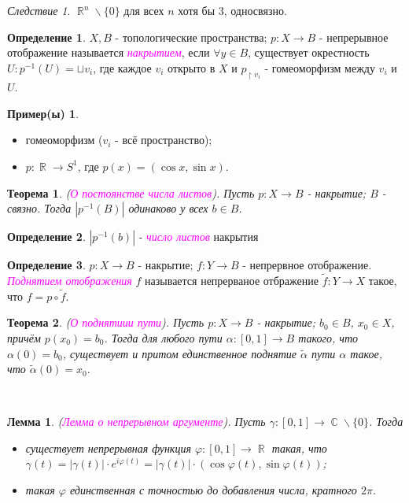 \documentclass[a4paper,100pt]{article}
\theoremstyle{indented}
\newtheorem{theorem}{Теорема}
\newtheorem{lemma}{Лемма}
\theoremstyle{definition}
\newtheorem{defn}{Определение}
\newtheorem{exl}{Пример(ы)}
\theoremstyle{remark}
\newtheorem{cons}{Следствие}
\DeclareMathOperator{\ra}{\rightarrow}
\DeclareMathOperator{\CC}{\mathbb{C}}
\DeclareMathOperator{\RR}{\mathbb{R}}
\begin{document}
\begin{cons}
    $\RR^n \backslash \{0\}$ для всех $n$ хотя бы 3, односвязно.
\end{cons}

\begin{defn}
    $X, B$ - топологические пространства; $p: X \ra B$ - непрерывное отображение называется \textit{\textcolor{magenta}{\hypertarget{s116}{накрытием}}}, если $\forall y \in B$, существует окрестность $U: p^{-1}(U) = \sqcup v_i$, где каждое $v_i$ открыто в $X$ и $p_{\upharpoonright v_i}$ - гомеоморфизм между $v_i$ и $U$.
\end{defn}

\begin{exl} \ 
    \begin{itemize}
        \item гомеоморфизм ($v_i$ - всё пространство); 
        \item $p: \RR \ra S^1$, где $p(x) = (\cos x, \sin x)$. 
    \end{itemize}
\end{exl}

\begin{theorem}
    (\textit{\textcolor{magenta}{\hypertarget{s117}{О постоянстве числа листов}}}). Пусть $p: X \ra B$ - накрытие; $B$ - связно. Тогда $|p^{-1}(B)|$ одинаково у всех $b \in B$.
\end{theorem}

\begin{defn}
    $|p^{-1}(b)|$ - \textit{\textcolor{magenta}{\hypertarget{s118}{число листов}}} накрытия
\end{defn}

\begin{defn}
    $p: X \ra B$ - накрытие; $f: Y \ra B$ - непрервное отображение. \textit{\textcolor{magenta}{\hypertarget{s119}{Поднятием отображения}}} $f$ называется непрерваное отбражение $\tilde{f}: Y \ra X$ такое, что $f = p \circ \tilde{f}$. 
\end{defn}

\begin{theorem}
    (\textit{\textcolor{magenta}{\hypertarget{s120}{О поднятиии пути}}}). Пусть $p: X \ra B$ - накрытие; $b_0 \in B$, $x_0 \in X$, причём $p(x_0) = b_0$. Тогда для любого пути $\alpha: [0, 1] \ra B$ такого, что $\alpha(0) = b_0$, существует и притом единственное поднятие $\tilde{\alpha}$ пути $\alpha$ такое, что $\tilde{\alpha}(0) = x_0$. 
\end{theorem} \ 

\begin{lemma}
    (\textit{\textcolor{magenta}{\hypertarget{s121}{Лемма о непрерывном аргументе}}}). Пусть $\gamma: [0, 1] \ra \CC \backslash \{0\}$. Тогда 

    \begin{itemize}
        \item существует непрерывная функция $\varphi: [0, 1] \ra \RR$ такая, что $\gamma(t) = |\gamma(t)|\cdot e^{i \varphi(t)} = |\gamma(t)|\cdot (\cos \varphi(t), \sin \varphi(t))$; 
        \item такая $\varphi$ единственная с точностью до добавления числа, кратного $2\pi$.
    \end{itemize}
\end{lemma}
\end{document}
